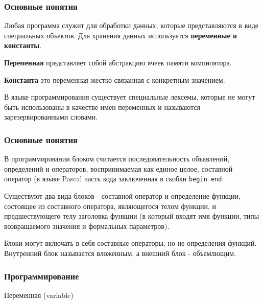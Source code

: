 	\begin{frame}
\frametitle{Основные понятия}


Любая программа служит для обработки данных, которые представляются в виде специальных объектов. Для хранения данных используется \textbf{переменные и константы}.

\textbf{Переменная} представляет собой абстракцию ячеек памяти компилятора.

\textbf{Константа} это переменная жестко связанная с конкретным значением. 

В языке программирования существует специальные лексемы, которые не могут быть использованы в качестве имен переменных и называются зарезервированными словами.

\end{frame}

	\begin{frame}
\frametitle{Основные понятия}


В программировании блоком считается последовательность объявлений, определений и операторов, воспринимаемая как единое целое, составной оператор (в языке Pascal часть кода заключенная в скобки \texttt{begin end}. 

Существуют два вида блоков - составной оператор и определение функции, состоящее из составного оператора, являющегося телом функции, и предшествующего телу заголовка функции (в который входят имя функции, типы возвращаемого значения и формальных параметров). 

Блоки могут включать в себя составные операторы, но не определения функций. Внутренний блок называется вложенным, а внешний блок - объемлющим. 

\end{frame}

\begin{frame}
\frametitle{Программирование}

\begin{center}

\Huge
Переменная (variable)
	
\end{center}
\end{frame}

